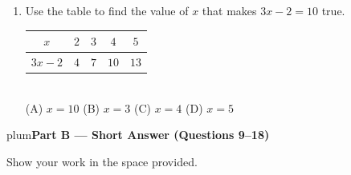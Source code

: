 \documentclass[10pt]{article}
\newcommand{\parthead}[1]{%
  \vspace{6pt}\noindent
  \begin{headlinebox}{plum}{\color{white}\bfseries #1}\end{headlinebox}%
  \vspace{4pt}}
\begin{document}
\begin{enumerate}[leftmargin=1.9em, itemsep=12pt]
  \item Use the table to find the value of $x$ that makes $3x - 2 = 10$ true.
    \quad
    \renewcommand{\arraystretch}{1.2}
    \begin{tabular}{|c|c|c|c|c|}
    \hline
    $x$      & $2$ & $3$ & $4$  & $5$ \\ \hline
    $3x - 2$ & $4$ & $7$ & $10$ & $13$ \\ \hline
    \end{tabular}
    \\[4pt]\hspace*{1em}
    (A) $x = 10$ \quad (B) $x = 3$ \quad (C) $x = 4$ \quad (D) $x = 5$
    \hfill {}\gradedblank[id=a8, type=choice, points=1, answer=C]{1.1cm}{13pt}\vphantom{\blank{0pt}}

\end{enumerate}

\boxguard[20]
\parthead{Part B --- Short Answer (Questions 9--18)}
Show your work in the space provided.
\end{document}
